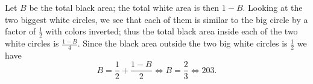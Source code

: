 \begin{solution}\hfil\medskip

	Let $B$ be the total black area; the total white area is then $1 - B$. Looking at the two biggest white circles, we see that each of them is similar
	to the big circle by a factor of $\frac{1}{2}$ with colors inverted; thus the total black area inside each of the two white circles is $\frac{1 - B}{4}$.
	Since the black area outside the two big white circles is $\frac{1}{2}$ we have $$B = \dfrac{1}{2} + \dfrac{1 - B}{2} \iff B = \dfrac{2}{3} \iff \boxed{203}.$$
\end{solution}